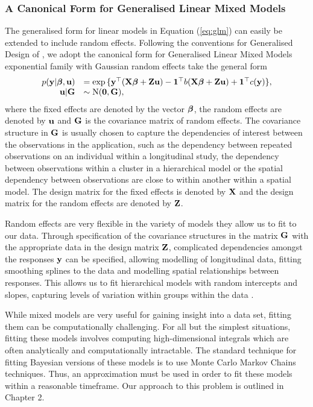 \subsubsection{A Canonical Form for Generalised Linear Mixed Models}
The generalised form for linear models in Equation (\ref{eq:glm}) can easily be extended to include random
effects.  Following the conventions for Generalised Design of \citep{Zhao2006}, we adopt the canonical form
for Generalised Linear Mixed Models exponential family with Gaussian random effects take the general form
$$
\begin{array}{rl}\label{eq:glmm}
	p({\bf y} | {\boldsymbol \beta}, {\bf u}) &= \exp{\{ {\bf y}^\top ({\bf X}{\boldsymbol\beta}+ {\bf Z}{\bf u}) - {\bf1}^\top b({\bf X}{\boldsymbol\beta}+ {\bf Z}{\bf u}) + {\bf1}^\top c({\bf y}) \}}, \\
	{\bf u} | {\bf G} &\sim \text{N}({\bf 0}, {\bf G}),
\end{array}
$$
where the fixed effects are denoted by the vector ${\boldsymbol \beta}$, the random effects are denoted by ${\bf u}$ and ${\bf G}$
is the covariance matrix of random effects. The covariance structure in ${\bf G}$ is usually chosen to capture the
dependencies of interest between the observations in the application, such as the dependency between repeated
observations on an individual within a longitudinal study, the dependency between observations within a
cluster in a hierarchical model or the spatial dependency between observations are close to within another
within a spatial model. The design matrix for the fixed effects is denoted by ${\bf X}$ and the design matrix for
the random effects are denoted by ${\bf Z}$.

Random effects are very flexible in the variety of models they allow us to fit to our data. Through
specification of the covariance structures in the matrix ${\bf G}$ with the appropriate data in the design matrix
${\bf Z}$, complicated dependencies amongst the responses ${\bf y}$ can be specified, allowing modelling of
longitudinal data, fitting smoothing splines to the data and modelling spatial relationships between
responses. This allows us to fit hierarchical models with random intercepts and slopes, capturing levels of variation within groups within the data \citep{Gelman2007}.

While mixed models are very useful for gaining insight into a data set, fitting them can be computationally
challenging. For all but the simplest situations, fitting these models involves computing high-dimensional
integrals which are often analytically and computationally intractable. The standard technique for fitting
Bayesian versions of these models is to use Monte Carlo Markov Chains techniques. Thus, an approximation must
be used in order to fit these models within a reasonable timeframe. Our approach to this problem is outlined
in Chapter 2.

